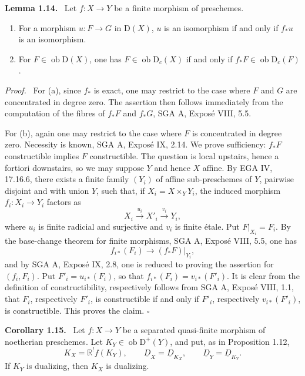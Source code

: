 \documentclass[11pt]{article}
\providecommand{\qedtext}{\hfill$\square$}
\newenvironment{statement}[1]{\par\medskip\noindent\textbf{#1.}\ }{\par\medskip}
\newenvironment{prooftext}[1][Proof]{\par\noindent\emph{#1.}\ }{\par\medskip}
\newcommand{\D}{\mathrm{D}}
\newcommand{\ob}{\operatorname{ob}}
\providecommand{\ob}{\operatorname{ob}}
\providecommand{\qedtext}{\hfill$\square$}
\begin{document}
\begin{statement}{Lemma 1.14}
Let $f:X\to Y$ be a finite morphism of preschemes.
\begin{enumerate}[label=\alph*)]
\item For a morphism $u:F\to G$ in $\D(X)$, $u$ is an isomorphism if and only if $f_*u$ is an isomorphism.
\item For $F\in\ob\D(X)$, one has $F\in\ob\D_c(X)$ if and only if $f_*F\in\ob\D_c(F)$.
\end{enumerate}
\end{statement}

\begin{prooftext}
For (a), since $f_*$ is exact, one may restrict to the case where $F$ and $G$ are concentrated in degree zero. The assertion then follows immediately from the computation of the fibres of $f_*F$ and $f_*G$, SGA A, Exposé VIII, 5.5.

For (b), again one may restrict to the case where $F$ is concentrated in degree zero. Necessity is known, SGA A, Exposé IX, 2.14. We prove sufficiency: $f_*F$ constructible implies $F$ constructible. The question is local upstairs, hence a fortiori downstairs, so we may suppose $Y$ and hence $X$ affine. By EGA IV, 17.16.6, there exists a finite family $(Y_i)$ of affine sub-preschemes of $Y$, pairwise disjoint and with union $Y$, such that, if $X_i=X\times_YY_i$, the induced morphism $f_i:X_i\to Y_i$ factors as
\[
   X_i\xrightarrow{u_i}X'_i\xrightarrow{v_i}Y_i,
\]
where $u_i$ is finite radicial and surjective and $v_i$ is finite étale. Put $F|_{X_i}=F_i$. By the base-change theorem for finite morphisms, SGA A, Exposé VIII, 5.5, one has
\[
   f_{i*}(F_i)\to(f_*F)|_{Y_i},
\]
and by SGA A, Exposé IX, 2.8, one is reduced to proving the assertion for $(f_i,F_i)$. Put $F'_i=u_{i*}(F_i)$, so that $f_{i*}(F_i)=v_{i*}(F'_i)$. It is clear from the definition of constructibility, respectively follows from SGA A, Exposé VIII, 1.1, that $F_i$, respectively $F'_i$, is constructible if and only if $F'_i$, respectively $v_{i*}(F'_i)$, is constructible. This proves the claim. \qedtext
\end{prooftext}

\begin{statement}{Corollary 1.15}
Let $f:X\to Y$ be a separated quasi-finite morphism of noetherian preschemes. Let $K_Y\in\ob\D^+(Y)$, and put, as in Proposition 1.12,
\[
   K_X=\mathbb{R}^!f(K_Y),\qquad \underline D_X=\underline D_{K_X},\qquad \underline D_Y=\underline D_{K_Y}.
\]
If $K_Y$ is dualizing, then $K_X$ is dualizing.
\end{statement}
\end{document}
